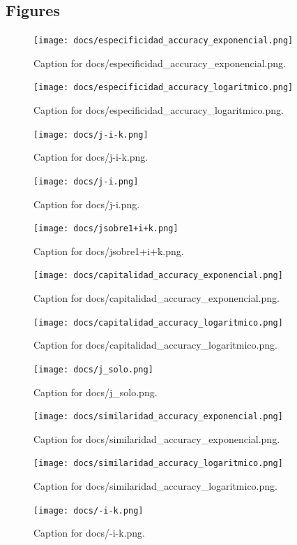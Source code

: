 \documentclass{article}
\begin{document}
\subsection{Figures}
\begin{figure}[h] \centering \texttt{[image: docs/especificidad\_accuracy\_exponencial.png]} \caption{Caption for docs/especificidad_accuracy_exponencial.png.} \end{figure}
\begin{figure}[h] \centering \texttt{[image: docs/especificidad\_accuracy\_logaritmico.png]} \caption{Caption for docs/especificidad_accuracy_logaritmico.png.} \end{figure}
\begin{figure}[h] \centering \texttt{[image: docs/j-i-k.png]} \caption{Caption for docs/j-i-k.png.} \end{figure}
\begin{figure}[h] \centering \texttt{[image: docs/j-i.png]} \caption{Caption for docs/j-i.png.} \end{figure}
\begin{figure}[h] \centering \texttt{[image: docs/jsobre1+i+k.png]} \caption{Caption for docs/jsobre1+i+k.png.} \end{figure}
\begin{figure}[h] \centering \texttt{[image: docs/capitalidad\_accuracy\_exponencial.png]} \caption{Caption for docs/capitalidad_accuracy_exponencial.png.} \end{figure}
\begin{figure}[h] \centering \texttt{[image: docs/capitalidad\_accuracy\_logaritmico.png]} \caption{Caption for docs/capitalidad_accuracy_logaritmico.png.} \end{figure}
\begin{figure}[h] \centering \texttt{[image: docs/j\_solo.png]} \caption{Caption for docs/j_solo.png.} \end{figure}
\begin{figure}[h] \centering \texttt{[image: docs/similaridad\_accuracy\_exponencial.png]} \caption{Caption for docs/similaridad_accuracy_exponencial.png.} \end{figure}
\begin{figure}[h] \centering \texttt{[image: docs/similaridad\_accuracy\_logaritmico.png]} \caption{Caption for docs/similaridad_accuracy_logaritmico.png.} \end{figure}
\begin{figure}[h] \centering \texttt{[image: docs/-i-k.png]} \caption{Caption for docs/-i-k.png.} \end{figure}
\end{document}
